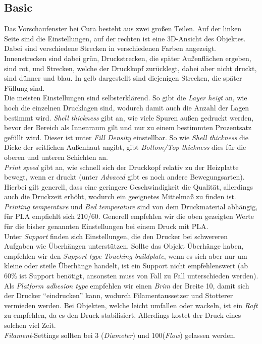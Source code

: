 \documentclass[11pt,a4paper]{scrartcl}
\begin{document}
\subsection*{Basic}
Das Vorschaufenster bei Cura besteht aus zwei großen Teilen. Auf der linken Seite sind die Einstellungen, auf der rechten ist eine 3D-Ansicht des Objektes. Dabei sind verschiedene Strecken in verschiedenen Farben angezeigt. Innenstrecken sind dabei grün, Druckstrecken, die später Außenflächen ergeben, sind rot, und Strecken, welche der Druckkopf zurücklegt, dabei aber nicht druckt, sind dünner und blau. In gelb dargestellt sind diejenigen Strecken, die später Füllung sind.\\
Die meisten Einstellungen sind selbsterklärend. So gibt die \textit{Layer heigt} an, wie hoch die einzelnen Drucklagen sind, wodurch damit auch die Anzahl der Lagen bestimmt wird. \textit{Shell thickness} gibt an, wie viele Spuren außen gedruckt werden, bevor der Bereich als Innenraum gilt und nur zu einem bestimmten Prozentsatz gefüllt wird. Dieser ist unter \textit{Fill Density} einstellbar. So wie \textit{Shell thickness} die Dicke der seitlichen Außenhaut angibt, gibt \textit{Bottom/Top thickness} dies für die oberen und unteren Schichten an.\\
\textit{Print speed} gibt an, wie schnell sich der Druckkopf relativ zu der Heizplatte bewegt, wenn er druckt (unter \textit{Advaced} gibt es noch andere Bewegungsarten). Hierbei gilt generell, dass eine geringere Geschwindigkeit die Qualität, allerdings auch die Druckzeit erhöht, wodurch ein geeignetes Mittelmaß zu finden ist. \textit{Printing temperature} und \textit{Bed temperature} sind von dem Druckmaterial abhängig, für PLA empfiehlt sich 210/60. Generell empfehlen wir die oben gezeigten Werte für die bisher genannten Einstellungen bei einem Druck mit PLA.\\
Unter \textit{Support} finden sich Einstellungen, die den Drucker bei schwereren Aufgaben wie Überhängen unterstützen. Sollte das Objekt Überhänge haben, empfehlen wir den \textit{Support type} \textit{Touching buildplate}, wenn es sich aber nur um kleine oder steile Überhänge handelt, ist ein Support nicht empfehlenswert (ab 60\% ist Support benötigt, ansonsten muss von Fall zu Fall unterschieden werden). Als \textit{Platform adhesion type} empfehlen wir einen \textit{Brim} der Breite 10, damit sich der Drucker \enquote{eindrucken} kann, wodurch Filamentaussetzer und Stotterer vermieden werden. Bei Objekten, welche leicht umfallen oder wackeln, ist ein \textit{Raft} zu empfehlen, da es den Druck stabilisiert. Allerdings kostet der Druck eines solchen viel Zeit.\\
\textit{Filament}-Settings sollten bei 3 (\textit{Diameter}) und 100(\textit{Flow}) gelassen werden.\\
\\
\end{document}
